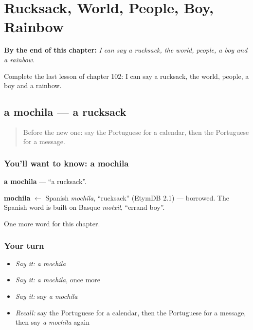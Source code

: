 
\chapter{Rucksack, World, People, Boy, Rainbow}
\label{ch:pt-rucksack-world-people-boy-rainbow}

\begin{chapteropening}
\textbf{By the end of this chapter:} \emph{I can say a rucksack, the world, people, a boy and a rainbow.}

Complete the last lesson of chapter 102: I can say a rucksack, the world, people, a boy and a rainbow.
\end{chapteropening}

\section[a mochila]{a mochila — a rucksack}

\label{lesson:PT-C102-mochila}



\begin{quote}
Before the new one: say the Portuguese for a calendar, then the Portuguese for a message.
\end{quote}

\subsection*{You'll want to know: a mochila}
\textbf{a mochila} — \textquotedblleft{}a rucksack\textquotedblright{}.

\begin{cousinweb}
\textbf{mochila} $\leftarrow$ Spanish \emph{mochila}, \textquotedblleft{}rucksack\textquotedblright{} (EtymDB 2.1) — borrowed. The Spanish word is built on Basque \emph{motxil}, \textquotedblleft{}errand boy\textquotedblright{}.
\end{cousinweb}

\begin{grammarlens}[title={What you've built}]
One more word for this chapter.
\end{grammarlens}

\subsection*{Your turn}
\begin{itemize}
\raggedright
  \item \emph{Say it:} \emph{a mochila}
  \item \emph{Say it:} \emph{a mochila}, once more
  \item \emph{Say it:} say \emph{a mochila}
  \item \emph{Recall:} say the Portuguese for a calendar, then the Portuguese for a message, then say \emph{a mochila} again
\end{itemize}

